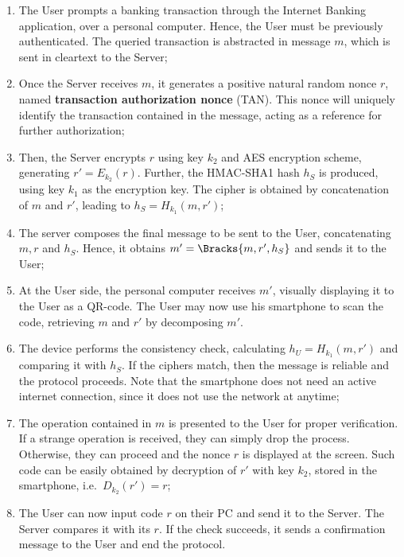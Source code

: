 \begin{enumerate}
  \item The User prompts a banking transaction through the Internet Banking application, over a personal computer. Hence, the User must be previously authenticated. The queried transaction is abstracted in message $m$, which is sent in cleartext to the Server;

  \item Once the Server receives $m$, it generates a positive natural random nonce $r$, named \textbf{transaction authorization nonce} (TAN). This nonce will uniquely identify the transaction contained in the message, acting as a reference for further authorization;

  \item Then, the Server encrypts $r$ using key $k_2$ and AES encryption scheme, generating $r' = E_{k_2}(r)$. Further, the HMAC-SHA1 hash $h_S$ is produced, using key $k_1$ as the encryption key. The cipher is obtained by concatenation of $m$ and $r'$, leading to $h_S = H_{k_1}(m,r')$;

  \item The server composes the final message to be sent to the User, concatenating $m, r$ and $h_S$. Hence, it obtains $m' = \Bracks{m, r', h_S}$ and sends it to the User;

  \item At the User side, the personal computer receives $m'$, visually displaying it to the User as a QR-code. The User may now use his smartphone to scan the code, retrieving $m$ and $r'$ by decomposing $m'$.

  \item The device performs the consistency check, calculating $h_U = H_{k_1}(m, r')$ and comparing it with $h_S$. If the ciphers match, then the message is reliable and the protocol proceeds. Note that the smartphone does not need an active internet connection, since it does not use the network at anytime;

  \item The operation contained in $m$ is presented to the User for proper verification. If a strange operation is received, they can simply drop the process. Otherwise, they can proceed and the nonce $r$ is displayed at the screen. Such code can be easily obtained by decryption of $r'$ with key $k_2$, stored in the smartphone, i.e.\ $D_{k_2}(r') = r$;

  \item The User can now input code $r$ on their PC and send it to the Server. The Server compares it with its $r$. If the check succeeds, it sends a confirmation message to the User and end the protocol.
\end{enumerate}

